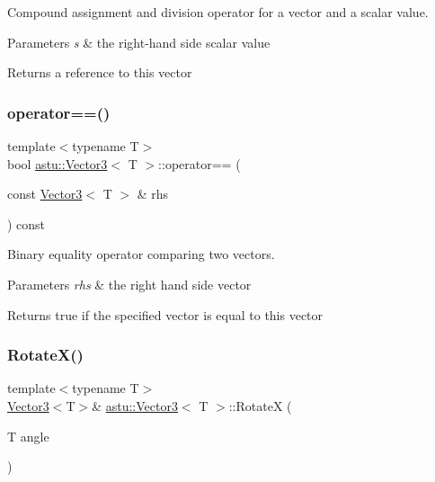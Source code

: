 Compound assignment and division operator for a vector and a scalar value.


\begin{DoxyParams}{Parameters}
{\em s} & the right-\/hand side scalar value \\
\hline
\end{DoxyParams}
\begin{DoxyReturn}{Returns}
a reference to this vector 
\end{DoxyReturn}
\mbox{\label{classastu_1_1Vector3_ae6ce2eeed8a3396664797ee680fda88a}} 
\subsubsection{\texorpdfstring{operator==()}{operator==()}}
{\footnotesize\ttfamily template$<$typename T$>$ \\
bool \hyperlink{classastu_1_1Vector3}{astu\+::\+Vector3}$<$ T $>$\+::operator== (\begin{DoxyParamCaption}\item[{const \hyperlink{classastu_1_1Vector3}{Vector3}$<$ T $>$ \&}]{rhs }\end{DoxyParamCaption}) const\hspace{0.3cm}{\ttfamily [inline]}}

Binary equality operator comparing two vectors.


\begin{DoxyParams}{Parameters}
{\em rhs} & the right hand side vector \\
\hline
\end{DoxyParams}
\begin{DoxyReturn}{Returns}
{\ttfamily true} if the specified vector is equal to this vector 
\end{DoxyReturn}
\mbox{\label{classastu_1_1Vector3_a94bd2e7f4cebae1c9187d8e7dcee98f5}} 
\subsubsection{\texorpdfstring{Rotate\+X()}{RotateX()}}
{\footnotesize\ttfamily template$<$typename T$>$ \\
\hyperlink{classastu_1_1Vector3}{Vector3}$<$T$>$\& \hyperlink{classastu_1_1Vector3}{astu\+::\+Vector3}$<$ T $>$\+::RotateX (\begin{DoxyParamCaption}\item[{T}]{angle }\end{DoxyParamCaption})\hspace{0.3cm}{\ttfamily [inline]}}

